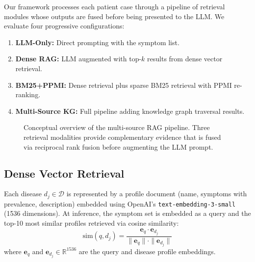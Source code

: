 \documentclass[preprint,12pt]{elsarticle}
\begin{document}
Our framework processes each patient case through a pipeline of retrieval modules whose outputs are fused before being presented to the LLM. We evaluate four progressive configurations:

\begin{enumerate}
    \item \textbf{LLM-Only:} Direct prompting with the symptom list.
    \item \textbf{Dense RAG:} LLM augmented with top-$k$ results from dense vector retrieval.
    \item \textbf{BM25+PPMI:} Dense retrieval plus sparse BM25 retrieval with PPMI re-ranking.
    \item \textbf{Multi-Source KG:} Full pipeline adding knowledge graph traversal results.
\end{enumerate}

\begin{figure}[t]
\centering
{}
\caption{Conceptual overview of the multi-source RAG pipeline. Three retrieval modalities provide complementary evidence that is fused via reciprocal rank fusion before augmenting the LLM prompt.}
\label{fig:architecture}
\end{figure}

\subsection{Dense Vector Retrieval}
\label{sec:dense}

Each disease $d_j \in \mathcal{D}$ is represented by a profile document (name, symptoms with prevalence, description) embedded using OpenAI's \texttt{text-embedding-3-small} (1536 dimensions). At inference, the symptom set is embedded as a query and the top-10 most similar profiles retrieved via cosine similarity:
\begin{equation}
    \text{sim}(q, d_j) = \frac{\mathbf{e}_q \cdot \mathbf{e}_{d_j}}{\|\mathbf{e}_q\| \cdot \|\mathbf{e}_{d_j}\|}
\end{equation}
where $\mathbf{e}_q$ and $\mathbf{e}_{d_j} \in \mathbb{R}^{1536}$ are the query and disease profile embeddings.
\end{document}
